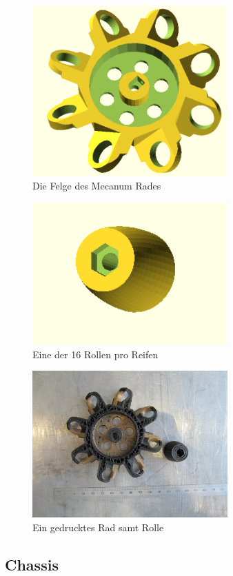 \documentclass[a4paper,bibtotoc,oneside]{scrbook}
\begin{document}
\begin{figure}[htbp]
\centering
\includegraphics[width=75mm]{img/wheel.png}
\caption{Die Felge des Mecanum Rades}\label{rad}
\end{figure}

\begin{figure}[htbp]
\centering
\includegraphics[width=75mm]{img/roller.png}
\caption{Eine der 16 Rollen pro Reifen}\label{rolle}
\end{figure}

\begin{figure}[htbp]
\centering
\includegraphics[width=75mm]{img/roller_wheel.jpg}
\caption{Ein gedrucktes Rad samt Rolle}\label{rollerad}
\end{figure}

\subsection{Chassis}\thispagestyle{empty}
\end{document}
